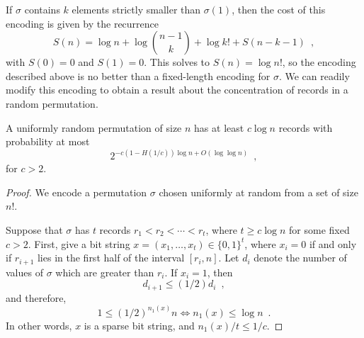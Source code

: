 \documentclass{patmorin}
\begin{document}
If $\sigma$ contains $k$ elements strictly smaller than $\sigma(1)$,
then the cost of this encoding is given by the recurrence
\[
S(n) = \log n + \log \binom{n - 1}{k} + \log k! + S(n - k - 1) \enspace ,
\]
with $S(0) = 0$ and $S(1) = 0$. This solves to $S(n) = \log n!$, so
the encoding described above is no better than a fixed-length encoding
for $\sigma$. We can readily modify this encoding to obtain a result
about the concentration of records in a random permutation.

\begin{thm}
  A uniformly random permutation of size $n$ has at least $c \log n$
  records with probability at most
  \[
  2^{-c (1 - H(1/c)) \log n + O(\log \log n)} \enspace ,
  \]
  for $c > 2$.
\end{thm}
\begin{proof}
  We encode a permutation $\sigma$ chosen uniformly at random from a
  set of size $n!$.

  Suppose that $\sigma$ has $t$ records $r_1 < r_2 < \cdots < r_t$,
  where $t \geq c \log n$ for some fixed $c > 2$. First, give a bit
  string $x = (x_1, \ldots, x_t) \in \{0, 1\}^t$, where $x_i = 0$ if
  and only if $r_{i + 1}$ lies in the first half of the interval
  $[r_{i}, n]$. Let $d_i$ denote the number of values of $\sigma$
  which are greater than $r_i$. If $x_i = 1$, then
  \[
  d_{i + 1} \leq (1/2) d_i \enspace ,
  \]
  and therefore,
  \[
  1 \leq (1/2)^{n_1(x)} n \iff n_1(x) \leq \log n \enspace .
  \]
  In other words, $x$ is a sparse bit string, and $n_1(x)/t \leq 1/c$.


\end{proof}
\end{document}
